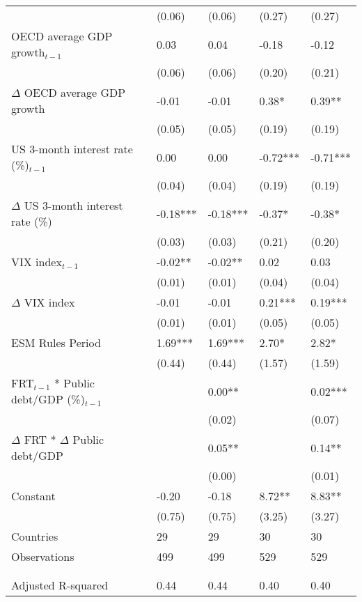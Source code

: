 \begin{tabular}{lp{3cm}p{3cm}p{3cm}p{3cm}}
   & (0.06) & (0.06) & (0.27) & (0.27) \\ 
  OECD average GDP growth$_{t-1}$ & 0.03 & 0.04 & -0.18 & -0.12 \\ 
   & (0.06) & (0.06) & (0.20) & (0.21) \\ 
  $\Delta$ OECD average GDP growth & -0.01 & -0.01 & 0.38* & 0.39** \\ 
   & (0.05) & (0.05) & (0.19) & (0.19) \\ 
  US 3-month interest rate (\%)$_{t-1}$ & 0.00 & 0.00 & -0.72*** & -0.71*** \\ 
   & (0.04) & (0.04) & (0.19) & (0.19) \\ 
  $\Delta$ US 3-month interest rate (\%) & -0.18*** & -0.18*** & -0.37* & -0.38* \\ 
   & (0.03) & (0.03) & (0.21) & (0.20) \\ 
  VIX index$_{t-1}$ & -0.02** & -0.02** & 0.02 & 0.03 \\ 
   & (0.01) & (0.01) & (0.04) & (0.04) \\ 
  $\Delta$ VIX index & -0.01 & -0.01 & 0.21*** & 0.19*** \\ 
   & (0.01) & (0.01) & (0.05) & (0.05) \\ 
  ESM Rules Period & 1.69*** & 1.69*** & 2.70* & 2.82* \\ 
   & (0.44) & (0.44) & (1.57) & (1.59) \\ 
  FRT$_{t-1}$ * Public debt/GDP (\%)$_{t-1}$ &  & 0.00** &  & 0.02*** \\ 
   &  & (0.02) &  & (0.07) \\ 
  $\Delta$ FRT * $\Delta$ Public debt/GDP &  & 0.05** &  & 0.14** \\ 
   &  & (0.00) &  & (0.01) \\ 
  Constant & -0.20 & -0.18 & 8.72** & 8.83** \\ 
   & (0.75) & (0.75) & (3.25) & (3.27) \\ 
  Countries & 29 & 29 & 30 & 30 \\ 
  Observations & 499 & 499 & 529 & 529 \\ 
   &  &  &  &  \\ 
   &  &  &  &  \\ 
  Adjusted R-squared & 0.44 & 0.44 & 0.40 & 0.40 \\ 
   \hline
\end{tabular}
\endgroup
